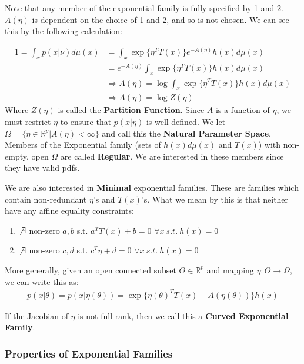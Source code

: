 \documentclass[]{article}
\theoremstyle{mattstyle}
\theoremstyle{definition}
\begin{document}
Note that any member of the exponential family is fully specified by 1 and 2. $A(\eta)$ is dependent on the choice of 1 and 2, and so is not chosen. We can see this by the following calculation:

\begin{align*}
1 = \int_x p(x | \nu) d\mu(x) &= \int_x \exp\{ \eta^TT(x)\}e^{-A(\eta)} h(x)d\mu(x)\\
&= e^{-A(\eta)}\int_x \exp\{ \eta^TT(x)\}h(x)d\mu(x)\\
&\Rightarrow A(\eta) = \log \int_x \exp\{ \eta^TT(x)\}h(x)d\mu(x)\\
&\Rightarrow A(\eta) = \log Z(\eta)
\end{align*}
Where $Z(\eta)$ is called the \textbf{Partition Function}. Since $A$ is a function of $\eta$, we must restrict $\eta$ to ensure that $p(x|\eta)$ is well defined. We let $\Omega = \{ \eta \in \mathbb{R}^p | A(\eta) < \infty\}$ and call this the \textbf{Natural Parameter Space}. Members of the Exponential family (sets of $h(x)d\mu(x)$ and $T(x)$) with non-empty, open $\Omega$ are called \textbf{Regular}. We are interested in these members since they have valid pdfs.
\newpage

We are also interested in \textbf{Minimal} exponential families. These are families which contain non-redundant $\eta$'s and $T(x)$'s. What we mean by this is that neither have any affine equality constraints:
\begin{enumerate}
	\item $\not\exists$ non-zero $a,b$ s.t. $a^TT(x)+b=0$ $\forall x \ s.t.\ h(x)=0$
	\item $\not\exists$ non-zero $c,d$ s.t. $c^T\eta+d=0$ $\forall x \ s.t.\ h(x)=0$
\end{enumerate}

More generally, given an open connected subset $\Theta \in \mathbb{R}^p$ and mapping $\eta: \Theta \rightarrow \Omega$, we can write this as:
\begin{align}
p(x|\theta) = p(x|\eta(\theta)) = \exp\{ \eta(\theta)^TT(x) - A(\eta(\theta))\}h(x)
\end{align}

If the Jacobian of $\eta$ is not full rank, then 
we call this a \textbf{Curved Exponential Family}.

\subsubsection{Properties of Exponential Families}
\end{document}

